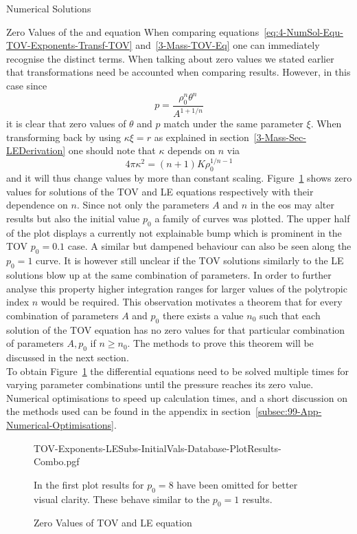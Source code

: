 \begin{section}{Numerical Solutions}
\begin{subsection}{Zero Values of the \texorpdfstring{}{TOV} and \texorpdfstring{}{LE} equation}
When comparing equations~\eqref{eq:4-NumSol-Equ-TOV-Exponents-Transf-TOV} and~\eqref{3-Mass-TOV-Eq} one can immediately recognise the distinct terms.
When talking about zero values we stated earlier that transformations need be accounted when comparing results.
However, in this case since
\begin{equation}
	p=\frac{\rho_0^n\theta^n}{A^{1+1/n}}
	\label{eq:4-NumSol-Pressure-Theta-Relation}
\end{equation}
it is clear that zero values of $\theta$ and $p$ match under the same parameter $\xi$.
When transforming back by using $\kappa\xi=r$ as explained in section~\ref{3-Mass-Sec-LEDerivation} one should note that $\kappa$ depends on $n$ via 
\begin{equation}
	4\pi\kappa^2=(n+1)K\rho_0^{1/n-1}
	\label{eq:4-NumSol-Conversion-Factor}
\end{equation}
and it will thus change values by more than constant scaling.
Figure~\ref{fig:4-NumSol-Plt-TOV-Exponents-Combo} shows zero values for solutions of the \ac{TOV} and \ac{LE} equations respectively with their dependence on $n$.
Since not only the parameters $A$ and $n$ in the \ac{eos} may alter results but also the initial value $p_0$ a family of curves was plotted.
The upper half of the plot displays a currently not explainable bump which is prominent in the \ac{TOV} $p_0=0.1$ case.
A similar but dampened behaviour can also be seen along the $p_0=1$ curve.
It is however still unclear if the \ac{TOV} solutions similarly to the \ac{LE} solutions blow up at the same combination of parameters.
In order to further analyse this property higher integration ranges for larger values of the polytropic index $n$ would be required.
This observation motivates a theorem that for every combination of parameters $A$ and $p_0$ there exists a value $n_0$ such that each solution of the TOV equation has no zero values for that particular combination of parameters $A,p_0$ if $n\geq n_0$.
The methods to prove this theorem will be discussed in the next section.\\
To obtain Figure~\ref{fig:4-NumSol-Plt-TOV-Exponents-Combo} the differential equations need to be solved multiple times for varying parameter combinations until the pressure reaches its zero value.
Numerical optimisations to speed up calculation times, and a short discussion on the methods used can be found in the appendix in section~\ref{subsec:99-App-Numerical-Optimisations}.
\begin{figure}[H]
	{\centering
	{TOV-Exponents-LESubs-InitialVals-Database-PlotResults-Combo.pgf}
	}
	\caption{Zero Values of TOV and LE equation}
	\label{fig:4-NumSol-Plt-TOV-Exponents-Combo}
	In the first plot results for $p_0=8$ have been omitted for better visual clarity.
	These behave similar to the $p_0=1$ results.
\end{figure}
\end{subsection}
%
%
\end{section}
